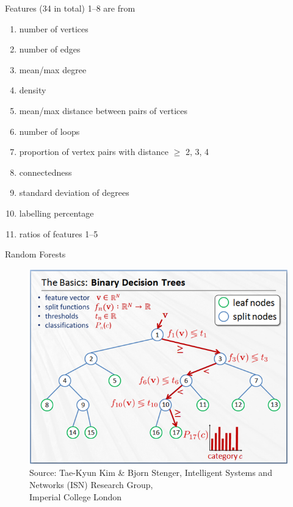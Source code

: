 \documentclass{beamer}
\begin{document}
\begin{frame}{Features (34 in total)}
  1--8 are from \cite{DBLP:conf/lion/KotthoffMS16}
  \begin{enumerate}
  \item number of vertices
  \item number of edges
  \item mean/max degree
  \item density
  \item mean/max distance between pairs of vertices
  \item number of loops
  \item proportion of vertex pairs with distance $\ge$ 2, 3, 4
  \item connectedness
    \pause
  \item standard deviation of degrees
  \item labelling percentage
    \pause
  \item ratios of features 1--5
  \end{enumerate}
\end{frame}

\begin{frame}{Random Forests \parencite{DBLP:journals/ml/Breiman01}}
  \begin{figure}
    \centering
    \includegraphics[scale=0.5]{random_forests_2.png} \\
    {\tiny\color{gray}Source: Tae-Kyun Kim \& Bjorn Stenger, Intelligent Systems and Networks (ISN) Research Group,\\[-7pt] Imperial College London}
  \end{figure}
\end{frame}
\end{document}
